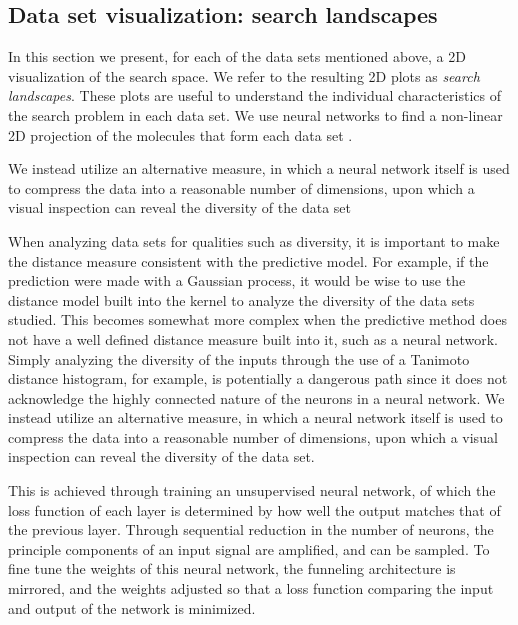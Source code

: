 \subsection{Data set visualization: search landscapes}

In this section we present, for each of the data sets mentioned above, a 2D visualization of the search space. We refer to the resulting 2D plots as \emph{search landscapes}. These plots are useful to understand the individual characteristics of the search problem in each data set. We use neural networks to find a non-linear 2D projection of the molecules that form each data set \cite{Hinton_2006}.

We instead utilize an alternative measure, in which a neural network itself is used to compress the data into a reasonable number of dimensions,  upon which a visual inspection can reveal the diversity of the data set

When analyzing data sets for qualities such as diversity, it is important to make the distance measure consistent with the predictive model.  For example, if the prediction were made with a Gaussian process, it would be wise to use the distance model built into the kernel to analyze the diversity of the data sets studied.  This becomes somewhat more complex when the predictive method does not have a well defined distance measure built into it, such as a neural network.  Simply analyzing the diversity of the inputs through the use of a Tanimoto distance histogram, for example, is potentially a dangerous path since it does not acknowledge the highly connected nature of the neurons in a neural network.  We instead utilize an alternative measure, in which a neural network itself is used to compress the data into a reasonable number of dimensions, \cite{Hinton_2006} upon which a visual inspection can reveal the diversity of the data set.

This is achieved through training an unsupervised neural network, of which the loss function of each layer is determined by how well the output matches that of the previous layer.  Through sequential reduction in the number of neurons, the principle components of an input signal are amplified, and can be sampled.  To fine tune the weights of this neural network, the funneling architecture is mirrored, and the weights adjusted so that a loss function comparing the input and output of the network is minimized.

